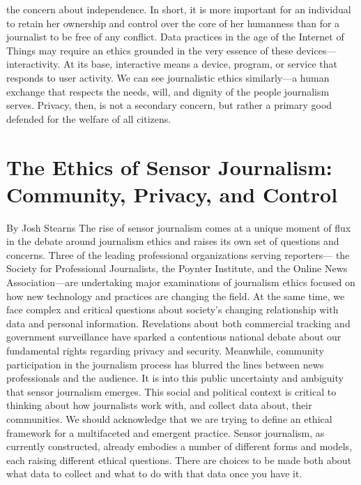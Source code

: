 the concern about independence. In short, it is more important for an individual
to retain her ownership and control over the core of her humanness
than for a journalist to be free of any conflict.
Data practices in the age of the Internet of Things may require an ethics
grounded in the very essence of these devices—interactivity. At its base,
interactive means a device, program, or service that responds to user
activity. We can see journalistic ethics similarly—a human exchange that
respects the needs, will, and dignity of the people journalism serves. Privacy,
then, is not a secondary concern, but rather a primary good defended
for the welfare of all citizens.

\section{The Ethics of Sensor Journalism: Community, Privacy, and Control}
By Josh Stearns
The rise of sensor journalism comes at a unique moment of flux in the
debate around journalism ethics and raises its own set of questions and
concerns. Three of the leading professional organizations serving reporters—
the Society for Professional Journalists, the Poynter Institute, and the
Online News Association—are undertaking major examinations of journalism
ethics focused on how new technology and practices are changing
the field.
At the same time, we face complex and critical questions about society's
changing relationship with data and personal information. Revelations
about both commercial tracking and government surveillance have sparked
a contentious national debate about our fundamental rights regarding privacy
and security. Meanwhile, community participation in the journalism
process has blurred the lines between news professionals and the audience.
It is into this public uncertainty and ambiguity that sensor journalism
emerges. This social and political context is critical to thinking about how
journalists work with, and collect data about, their communities.
We should acknowledge that we are trying to define an ethical framework
for a multifaceted and emergent practice. Sensor journalism, as currently
constructed, already embodies a number of different forms and models,
each raising different ethical questions. There are choices to be made both
about what data to collect and what to do with that data once you have it.

